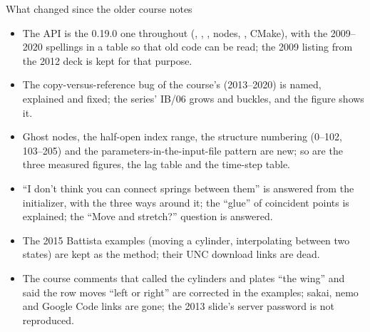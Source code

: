 \documentclass[aspectratio=169,11pt]{beamer}
\begin{document}
\begin{frame}{What changed since the older course notes}
\label{fr:changed}
\small
\begin{itemize}
  \item The API is the 0.19.0 one throughout (, , ,  nodes, , CMake), with the 2009--2020 spellings in a table so that old code can be read; the 2009 listing from the 2012 deck is kept for that purpose.
  \item The copy-versus-reference bug of the course's  (2013--2020) is named, explained and fixed; the series' IB/06 grows and buckles, and the figure shows it.
  \item Ghost nodes, the half-open index range, the structure numbering (0--102, 103--205) and the parameters-in-the-input-file pattern are new; so are the three measured figures, the lag table and the time-step table.
  \item ``I don't think you can connect springs between them'' is answered from the initializer, with the three ways around it; the ``glue'' of coincident points is explained; the ``Move and stretch?'' question is answered.
  \item The 2015 Battista examples (moving a cylinder, interpolating between two states) are kept as the method; their UNC download links are dead.
  \item The course comments that called the cylinders and plates ``the wing'' and said the row moves ``left or right'' are corrected in the examples; sakai, nemo and Google Code links are gone; the 2013 slide's server password is not reproduced.
\end{itemize}
\end{frame}
\end{document}
